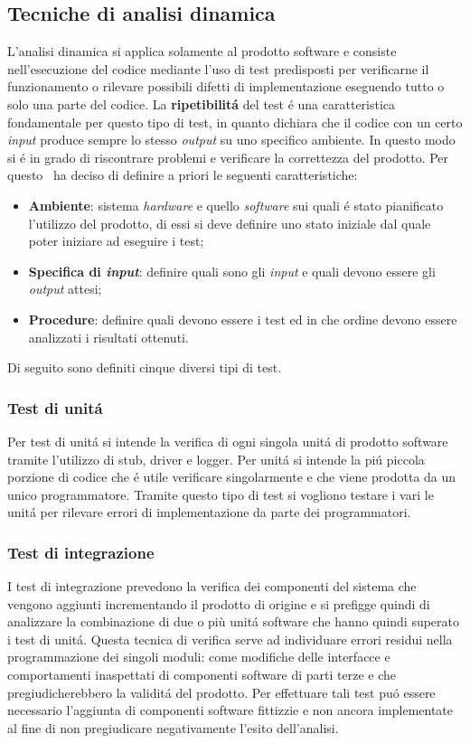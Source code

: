\subsection{Tecniche di analisi dinamica}
L'analisi dinamica si applica solamente al prodotto software e consiste nell'esecuzione del codice mediante l'uso di test predisposti per verificarne il funzionamento o rilevare possibili difetti di implementazione eseguendo tutto o solo una parte del codice.
La \textbf{ripetibilit\'a} del test \'e una caratteristica fondamentale per questo tipo di test, in quanto dichiara che il codice con un certo \textit{input} produce sempre lo stesso \textit{output} su uno specifico ambiente. In questo modo si \'e in grado di riscontrare problemi e verificare la correttezza del prodotto.
Per questo \gruppo ~ha deciso di definire a priori le seguenti caratteristiche:
\begin{itemize}
\item \textbf{Ambiente}: sistema \textit{hardware} e quello \textit{software} sui quali \'e stato pianificato l'utilizzo del prodotto, di essi si deve definire uno stato iniziale dal quale poter iniziare ad eseguire i test;
\item \textbf{Specifica di \textit{input}}: definire quali sono gli \textit{input} e quali devono essere gli \textit{output} attesi;
\item \textbf{Procedure}: definire quali devono essere i test ed in che ordine devono essere analizzati i risultati ottenuti.
\end{itemize}
Di seguito sono definiti cinque diversi tipi di test.
\subsubsection{Test di unit\'a} 
Per test di unit\'a si intende la verifica di ogni singola unit\'a di prodotto software tramite l'utilizzo di stub, driver e logger. Per unit\'a si intende la pi\'u piccola porzione di codice che \'e utile verificare singolarmente e che viene prodotta da un unico programmatore. Tramite questo tipo di test si vogliono testare i vari le unit\'a per rilevare errori di implementazione da parte dei programmatori.
\subsubsection{Test di integrazione}
I test di integrazione prevedono la verifica dei componenti del sistema che vengono aggiunti incrementando il prodotto di origine e si prefigge quindi di analizzare la combinazione di due o più unit\'a software che hanno quindi superato i test di unit\'a. Questa tecnica di verifica serve ad individuare errori residui nella programmazione dei singoli moduli: come modifiche delle interfacce e comportamenti inaspettati di componenti software di parti terze e che pregiudicherebbero la validit\'a del prodotto. Per effettuare tali test pu\'o essere necessario l'aggiunta di componenti software fittizzie e non ancora implementate al fine di non pregiudicare negativamente l'esito dell'analisi.
